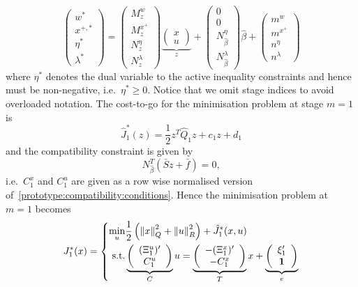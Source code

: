 \documentclass{ifacconf}
\providecommand{\norm}[1]{\left\|#1\right\|}
\begin{document}
\[
      \left(\begin{array}{c}
      w^\ast \\
      x^{+,\ast} \\
      \eta^\ast \\
      \lambda^\ast
      \end{array}\right) = \left(\begin{array}{c}M^w_z\\ M^{x^+}_z \\ N^{\eta}_z \\ N^{\lambda}_z
      \end{array}\right)\underbrace{\left(\begin{array}{c}x\\ u\end{array}\right)}_z + 
      \left(\begin{array}{c}0\\ 0 \\ N^{\eta}_{\hat\beta} \\ N^{\lambda}_{\hat\beta}
      \end{array}\right)\hat\beta + \left(\begin{array}{c}m^w\\ m^{x^+} \\ n^{\eta} \\ n^{\lambda}
      \end{array}\right)
\]
where $\eta^\ast$ denotes the dual variable to the active inequality constraints and hence must
be non-negative, i.e.~$\eta^\ast\geq0$. Notice that we omit stage indices to avoid overloaded notation.
The cost-to-go for the minimisation problem at stage $m=1$ is
\begin{equation}
	\hat J_1^\ast(z) = \frac{1}{2}z^T
    \hat Q_1 z + c_1 z + d_1
\end{equation}
and the compatibility constraint is given by
\begin{equation}\label{prototype:compatibility:conditions}
	N_{\hat\beta}^T(\bar S z + \bar f) = 0,
\end{equation}
i.e.\ $C_1^x$ and $C_1^u$ are given as a row wise normalised version of~\eqref{prototype:compatibility:conditions}.
Hence the minimisation problem at $m=1$ becomes
\begin{equation}
	J_1^\ast(x) = \left\{\begin{split}
	\min_{u} & \frac{1}{2}\left(\norm{x}^2_Q + \norm{u}_R^2\right) + \hat J_{1}^\ast(x,u)\\
    \text{s.t.} & 
    \underbrace{\left(\begin{array}{c}
    (\Xi_1^u)^\prime \\ C_1^u
    \end{array}\right)}_{\bar C}
    u
    = \underbrace{\left(\begin{array}{c}-(\Xi^x_1)^\prime \\ -C_1^x\end{array}\right)}_{
    \bar T
    }x + 
    \underbrace{\left(\begin{array}{c}\xi_1^\prime\\  {\bf{1}} \end{array}\right)}_{\bar e}
    \end{split}\right.
\end{equation}
\end{document}
